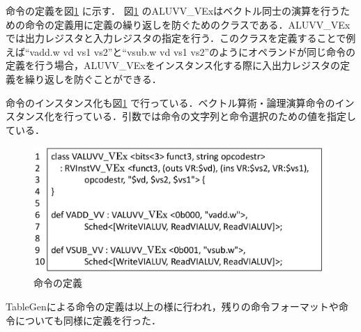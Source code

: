 命令の定義を図\ref{fig:Inst_def}
に示す．
図\ref{fig:Inst_def}
のALUVV\_VExはベクトル同士の演算を行うための命令の定義用に定義の繰り返しを防ぐためのクラスである．ALUVV\_VExでは出力レジスタと入力レジスタの指定を行う．このクラスを定義することで例えば``vadd.w vd vs1 vs2''と``vsub.w vd vs1 vs2''のようにオペランドが同じ命令の定義を行う場合，ALUVV\_VExをインスタンス化する際に入出力レジスタの定義を繰り返しを防ぐことができる．

命令のインスタンス化も図\ref{fig:Inst_def}
で行っている．ベクトル算術・論理演算命令のインスタンス化を行っている．引数では命令の文字列と命令選択のための値を指定している．

\begin{figure}[tb]
    \centering
    \includegraphics[scale=0.6]{image/Instruction_define.pdf}
    \caption{命令の定義}
    \label{fig:Inst_def}
\end{figure}

TableGenによる命令の定義は以上の様に行われ，残りの命令フォーマットや命令についても同様に定義を行った．
